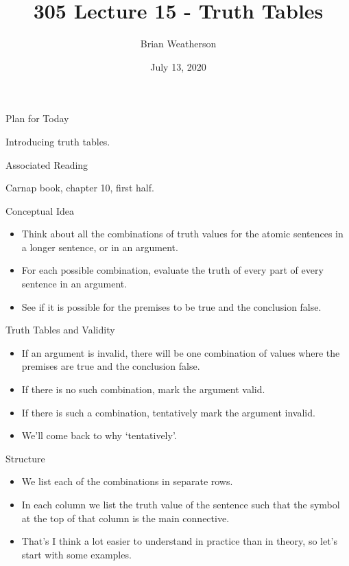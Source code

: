 \documentclass[
  ignorenonframetext,
]{beamer}
\title{305 Lecture 15 - Truth Tables}
\author{Brian Weatherson}
\date{July 13, 2020}
\providecommand{\tightlist}{%
  \setlength{\itemsep}{0pt}\setlength{\parskip}{0pt}}
\renewcommand{\,}{\text{, }}
\begin{document}
\frame{\titlepage}

\begin{frame}{Plan for Today}
\protect\hypertarget{plan-for-today}{}

Introducing truth tables.

\end{frame}

\begin{frame}{Associated Reading}
\protect\hypertarget{associated-reading}{}

Carnap book, chapter 10, first half.

\end{frame}

\begin{frame}{Conceptual Idea}
\protect\hypertarget{conceptual-idea}{}

\begin{itemize}[<+->]
\tightlist
\item
  Think about all the combinations of truth values for the atomic
  sentences in a longer sentence, or in an argument.
\item
  For each possible combination, evaluate the truth of every part of
  every sentence in an argument.
\item
  See if it is possible for the premises to be true and the conclusion
  false.
\end{itemize}

\end{frame}

\begin{frame}{Truth Tables and Validity}
\protect\hypertarget{truth-tables-and-validity}{}

\begin{itemize}[<+->]
\tightlist
\item
  If an argument is invalid, there will be one combination of values
  where the premises are true and the conclusion false.
\item
  If there is no such combination, mark the argument valid.
\item
  If there is such a combination, tentatively mark the argument invalid.
\item
  We'll come back to why `tentatively'.
\end{itemize}

\end{frame}

\begin{frame}{Structure}
\protect\hypertarget{structure}{}

\begin{itemize}
\tightlist
\item
  We list each of the combinations in separate rows.
\item
  In each column we list the truth value of the sentence such that the
  symbol at the top of that column is the main connective.
\item
  That's I think a lot easier to understand in practice than in theory,
  so let's start with some examples.
\end{itemize}

\end{frame}
\end{document}
